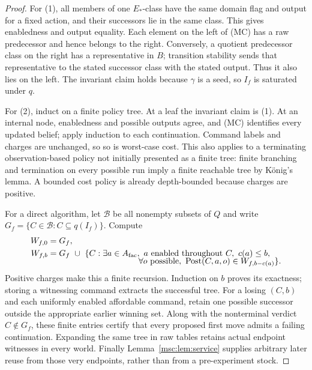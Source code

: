 \documentclass[11pt]{article}
\theoremstyle{definition}
\theoremstyle{remark}
\begin{document}
\begin{proof}
For (1), all members of one $E_*$-class have the same domain flag and
output for a fixed action, and their successors lie in the same class.
This gives enabledness and output equality. Each element on the left of
(MC) has a raw predecessor and hence belongs to the right. Conversely, a
quotient predecessor class on the right has a representative in $B$;
transition stability sends that representative to the stated successor
class with the stated output. Thus it also lies on the left. The invariant
claim holds because $\gamma$ is a seed, so $I_f$ is saturated under $q$.

For (2), induct on a finite policy tree. At a leaf the invariant claim is
(1). At an internal node, enabledness and possible outputs agree, and (MC)
identifies every updated belief; apply induction to each continuation.
Command labels and charges are unchanged, so so is worst-case cost. This
also applies to a terminating observation-based policy not initially
presented as a finite tree: finite branching and termination on every
possible run imply a finite reachable tree by K\"onig's lemma. A bounded
cost policy is already depth-bounded because charges are positive.

For a direct algorithm, let $\mathcal B$ be all nonempty subsets of $Q$ and
write $G_f=\{C\in\mathcal B:C\subseteq q(I_f)\}$. Compute
\begin{align*}
 W_{f,0}&=G_f,\\
 W_{f,b}&=G_f\ \cup\ \{C:\exists a\in A_{\rm fac},\
  a\text{ enabled throughout }C,\ c(a)\le b,\\[-2mm]
 &\hspace{38mm}\forall o\text{ possible},\
  \operatorname{Post}(C,a,o)\in W_{f,b-c(a)}\}.
\end{align*}
Positive charges make this a finite recursion. Induction on $b$ proves its
exactness; storing a witnessing command extracts the successful tree.
For a losing $(C,b)$ and each uniformly enabled affordable command, retain
one possible successor outside the appropriate earlier winning set. Along
with the nonterminal verdict $C\notin G_f$, these finite entries certify
that every proposed first move admits a failing continuation. Expanding the
same tree in raw tables retains actual endpoint witnesses in every world.
Finally Lemma~\ref{msc:lem:service} supplies arbitrary later reuse from those
very endpoints, rather than from a pre-experiment stock.
\end{proof}
\end{document}
